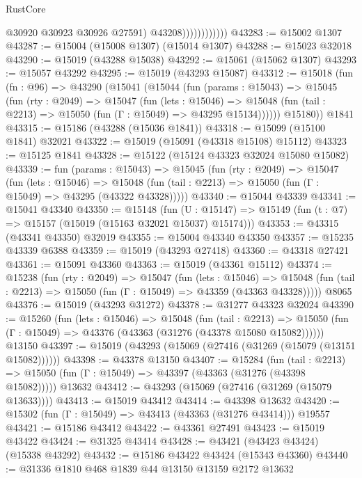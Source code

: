 \begin{lexlean}{RustCore}
\begin{coremodule}
                              @30920
                              @30923
                              @30926
                              @27591)
                            @43208))))))))))))
@43283 := @15002 @1307
@43287 := @15004 (@15008 @1307) (@15014 @1307)
@43288 := @15023 @32018
@43290 := @15019 (@43288 @15038)
@43292 := @15061 (@15062 @1307)
@43293 := @15057 @43292
@43295 := @15019 (@43293 @15087)
@43312 := @15018
    (fun (fn : @96) =>
    @43290
      (@15041
        (@15044
          (fun (params : @15043) =>
          @15045
            (fun (rty : @2049) =>
            @15047
              (fun (lets : @15046) =>
              @15048 (fun (tail : @2213) => @15050 (fun (Γ : @15049) => @43295 @15134))))))
        @15180))
    @1841
@43315 := @15186 (@43288 (@15036 @1841))
@43318 := @15099 (@15100 @1841) @32021
@43322 := @15019 (@15091 (@43318 @15108) @15112)
@43323 := @15125 @1841
@43328 := @15122 (@15124 @43323 @32024 @15080 @15082)
@43339 := fun (params : @15043) =>
  @15045
    (fun (rty : @2049) =>
    @15047
      (fun (lets : @15046) =>
      @15048 (fun (tail : @2213) => @15050 (fun (Γ : @15049) => @43295 (@43322 @43328)))))
@43340 := @15044 @43339
@43341 := @15041 @43340
@43350 := @15148
    (fun (U : @15147) => @15149 (fun (t : @7) => @15157 (@15019 (@15163 @32021 @15037) @15174)))
@43353 := @43315 (@43341 @43350) @32019
@43355 := @15004 @43340 @43350
@43357 := @15235 @43339 @6388
@43359 := @15019 (@43293 @27418)
@43360 := @43318 @27421
@43361 := @15091 @43360
@43363 := @15019 (@43361 @15112)
@43374 := @15238
    (fun (rty : @2049) =>
    @15047
      (fun (lets : @15046) =>
      @15048 (fun (tail : @2213) => @15050 (fun (Γ : @15049) => @43359 (@43363 @43328)))))
    @8065
@43376 := @15019 (@43293 @31272)
@43378 := @31277 @43323 @32024
@43390 := @15260
    (fun (lets : @15046) =>
    @15048
      (fun (tail : @2213) =>
      @15050 (fun (Γ : @15049) => @43376 (@43363 (@31276 (@43378 @15080 @15082))))))
    @13150
@43397 := @15019 (@43293 (@15069 (@27416 (@31269 (@15079 (@13151 @15082))))))
@43398 := @43378 @13150
@43407 := @15284
    (fun (tail : @2213) => @15050 (fun (Γ : @15049) => @43397 (@43363 (@31276 (@43398 @15082)))))
    @13632
@43412 := @43293 (@15069 (@27416 (@31269 (@15079 @13633))))
@43413 := @15019 @43412
@43414 := @43398 @13632
@43420 := @15302 (fun (Γ : @15049) => @43413 (@43363 (@31276 @43414))) @19557
@43421 := @15186 @43412
@43422 := @43361 @27491
@43423 := @15019 @43422
@43424 := @31325 @43414
@43428 := @43421 (@43423 @43424) (@15338 @43292)
@43432 := @15186 @43422 @43424 (@15343 @43360)
@43440 := @31336 @1810 @468 @1839 @44 @13150 @13159 @2172 @13632

\end{coremodule}
\end{lexlean}
